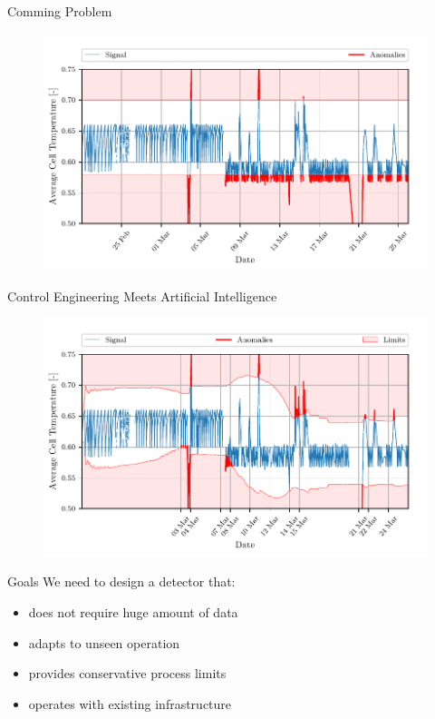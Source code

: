 \documentclass[aspectratio=169]{beamer}
\begin{document}
\begin{frame}{Comming Problem}
    \begin{figure}[htpb]
        \begin{center}
            \includegraphics[width=0.75\linewidth]{../ilustrate/pc2023/bess/naive/full_thresh.pdf}
        \end{center}
    \end{figure}
\end{frame}

\begin{frame}{Control Engineering Meets Artificial Intelligence}
    \begin{figure}[htpb]
        \begin{center}
            \includegraphics[width=0.75\linewidth]{../ilustrate/pc2023/bess/Average_Cell_Temperature_sliding_thresh.pdf}
        \end{center}
    \end{figure}
\end{frame}

\begin{frame}{Goals}
    We need to design a detector that:
    \begin{itemize}
        \item does not require huge amount of data
        \item adapts to unseen operation
        \item provides conservative process limits
        \item operates with existing infrastructure
    \end{itemize}
\end{frame}
\end{document}
